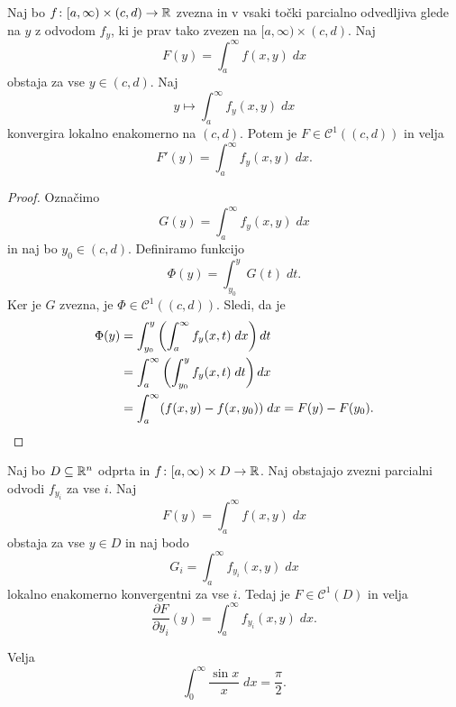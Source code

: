 
\begin{izrek}
Naj bo $f \colon [a,\infty) \times (c,d) \to \mathbb{R}$ zvezna in v vsaki
točki parcialno odvedljiva glede na $y$ z odvodom $f_y$, ki je prav
tako zvezen na $[a,\infty) \times (c,d)$. Naj
\[
F(y) = \int_a^\infty f(x,y)\;dx
\]
obstaja za vse $y \in (c,d)$. Naj
\[
y \mapsto \int_a^\infty f_y(x,y)\;dx
\]
konvergira lokalno enakomerno na $(c,d)$. Potem je
$F \in \mathcal{C}^1((c,d))$ in velja
\[
F'(y) = \int_a^\infty f_y(x,y)\;dx.
\]
\end{izrek}

\begin{proof}
Označimo
\[
G(y) = \int_a^\infty f_y(x,y)\;dx
\]
in naj bo $y_0 \in (c,d)$. Definiramo funkcijo
\[
\Phi(y) = \int_{y_0}^y G(t)\;dt.
\]
Ker je $G$ zvezna, je $\Phi \in \mathcal{C}^1((c,d))$. Sledi, da je
\begin{align*}
\Phi(y) &= \int_{y_0}^y \left(\int_a^\infty f_y(x,t)\;dx\right)dt
\\
&=
\int_a^\infty \left(\int_{y_0}^y f_y(x,t)\;dt\right)dx
\\
&=
\int_a^\infty (f(x,y) - f(x,y_0))\;dx = F(y) - F(y_0). \qedhere
\end{align*}
\end{proof}

\begin{posledica}
Naj bo $D \subseteq \mathbb{R}^n$ odprta in
$f \colon [a,\infty) \times D \to \mathbb{R}$. Naj obstajajo zvezni
parcialni odvodi $f_{y_i}$ za vse $i$. Naj
\[
F(y) = \int_a^\infty f(x,y)\;dx 
\]
obstaja za vse $y \in D$ in naj bodo
\[
G_i = \int_a^\infty f_{y_i}(x,y)\;dx
\]
lokalno enakomerno konvergentni za vse $i$. Tedaj je
$F \in \mathcal{C}^1(D)$ in velja
\[
\frac{\partial F}{\partial y_i}(y) =
\int_a^\infty f_{y_i}(x,y)\;dx.
\]
\end{posledica}

\begin{izrek}
Velja
\[
\int_0^\infty \frac{\sin x}{x}\;dx = \frac{\pi}{2}.
\]
\end{izrek}

